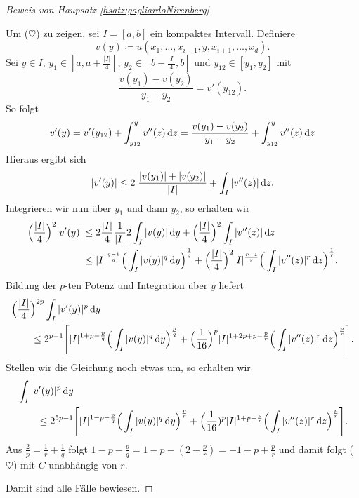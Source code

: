 \begin{proof}[Beweis von Haupsatz \ref{hsatz:gagliardoNirenberg}]
\begin{enumerate}
      Um ($\heartsuit$) zu zeigen, sei $I = [a,b]$ ein kompaktes Intervall.
      Definiere
      $$
      v(y) \coloneqq u(x_1,\dots,x_{i - 1},y,x_{i + 1},\dots,x_d).
      $$
      Sei $y \in I$, $y_1 \in [a,a + \frac{|I|}{4}]$, $y_2 \in [b - \frac{|I|}{4}, b]$ und $y_{12} \in [y_1, y_2]$ mit
      $$
      \frac{v(y_1) - v(y_2)}{y_1 - y_2} = v'(y_{12}).
      $$
      So folgt
      $$
      v'(y) 
      = v'(y_{12}) + \int_{y_{12}}^y v''(z) \, {\operatorname{d}\!{z}}
      = \frac{v(y_1) - v(y_2)}{y_1 - y_2} + \int_{y_{12}}^y v''(z) \, {\operatorname{d}\!{z}}
      $$
      Hieraus ergibt sich
      $$
      |v'(y)| \leq 2\; \frac{|v(y_1)| + |v(y_2)|}{|I|} + \int_I |v''(z)| \, {\operatorname{d}\!{z}}.
      $$
      Integrieren wir nun über $y_1$ und dann $y_2$, so erhalten wir
      \begin{align*}
        \Big( \frac{|I|}{4} \Big)^2 |v'(y)|
        &\leq 2 \frac{|I|}{4} \frac{1}{|I|} 2 \int_I |v(y)| \, {\operatorname{d}\!{y}} + \Big( \frac{|I|}{4}\Big)^2 \int_I |v''(z)| \, {\operatorname{d}\!{z}} \\
        &\leq |I|^{\frac{q - 1}{q}} \Big( \int_I |v(y)|^q \, {\operatorname{d}\!{y}} \Big)^{\frac{1}{q}} + \Big( \frac{|I|}{4} \Big)^2 |I|^{\frac{r - 1}{r}} \Big( \int_I |v''(z)|^r \, {\operatorname{d}\!{z}} \Big)^{\frac{1}{r}}.
      \end{align*}
      Bildung der $p$-ten Potenz und Integration über $y$ liefert
      \begin{align*}
        &\Big(\frac{|I|}{4}\Big)^{2p} \int_I |v'(y)|^p \, {\operatorname{d}\!{y}}\\  
        &\qquad\leq 2^{p - 1} \Bigg[ |I|^{1 + p - \frac{p}{q}} \Big( \int_I |v(y)|^q \, {\operatorname{d}\!{y}} \Big)^{\frac{p}{q}} + \Big(\frac{1}{16}\Big)^p |I|^{1 + 2p + p - \frac{p}{r}} \Big(\int_I |v''(z)|^r \, {\operatorname{d}\!{z}} \Big)^{\frac{p}{r}} \Bigg].
      \end{align*}
      Stellen wir die Gleichung noch etwas um, so erhalten wir
      \begin{align*}
        &\int_I |v'(y)|^p \, {\operatorname{d}\!{y}}  \\
        &\qquad \leq 2^{5p - 1} \Bigg[ |I|^{1 - p - \frac{p}{q}} \Big( \int_I |v(y)|^q \, {\operatorname{d}\!{y}} \Big)^{\frac{p}{r}} + \Big(\frac{1}{16})^p |I|^{1 + p - \frac{p}{r}} \Big( \int_I |v''(z)|^r \, {\operatorname{d}\!{z}} \Big)^{\frac{p}{r}} \Bigg].
      \end{align*}
      Aus $\frac{2}{p} = \frac{1}{r} + \frac{1}{q}$ folgt $1 - p - \frac{p}{q} = 1 - p - (2 - \frac{p}{r}) = -1 - p + \frac{p}{r}$ und damit folgt ($\heartsuit$) mit $C$ unabhängig von $r$.
\end{enumerate}
Damit sind alle Fälle bewiesen.
\end{proof}

